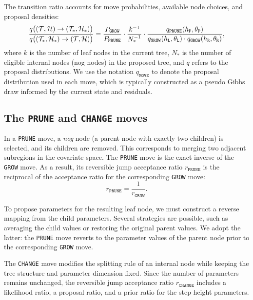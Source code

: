 The transition ratio accounts for move probabilities, available node choices, and proposal densities:
\begin{equation}
    \frac{q\big((\mathcal{T}, \mathcal{H}) \to (\mathcal{T}_*, \mathcal{H}_*)\big)}{q\big((\mathcal{T}_*, \mathcal{H}_*) \to (\mathcal{T}, \mathcal{H})\big)} 
    = \frac{P_\texttt{GROW}}{P_\texttt{PRUNE}} \cdot \frac{k^{-1}}{N_*^{-1}} \cdot \frac{q_\texttt{PRUNE}(h_\texttt{P}, \theta_\texttt{P})}{q_\texttt{GROW}(h_\texttt{L}, \theta_\texttt{L}) \cdot q_\texttt{GROW}(h_\texttt{R}, \theta_\texttt{R})},
\end{equation}
where $k$ is the number of leaf nodes in the current tree, $N_*$ is the number of eligible internal nodes (nog nodes) in the proposed tree, and $q$ refers to the proposal distributions.
We use the notation $q_\texttt{MOVE}$ to denote the proposal distribution used in each move, which is typically constructed as a pseudo Gibbs draw informed by the current state and residuals.


\subsection{The \texttt{PRUNE} and \texttt{CHANGE} moves}

In a \texttt{PRUNE} move, a \textit{nog} node (a parent node with exactly two children) is selected, and its children are removed. 
This corresponds to merging two adjacent subregions in the covariate space. 
The \texttt{PRUNE} move is the exact inverse of the \texttt{GROW} move. 
As a result, its reversible jump acceptance ratio $r_\texttt{PRUNE}$ is the reciprocal of the acceptance ratio for the corresponding \texttt{GROW} move:
\begin{equation}
    r_\texttt{PRUNE} = \frac{1}{r_\texttt{GROW}}.
\end{equation}

To propose parameters for the resulting leaf node, we must construct a reverse mapping from the child parameters. 
Several strategies are possible, such as averaging the child values or restoring the original parent values. 
We adopt the latter: the \texttt{PRUNE} move reverts to the parameter values of the parent node prior to the corresponding \texttt{GROW} move.

The \texttt{CHANGE} move modifies the splitting rule of an internal node while keeping the tree structure and parameter dimension fixed. 
Since the number of parameters remains unchanged, the reversible jump acceptance ratio $r_\texttt{CHANGE}$ includes a likelihood ratio, a proposal ratio, and a prior ratio for the step height parameters.

